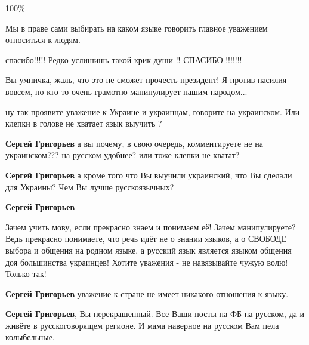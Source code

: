 \begin{itemize}
100\%

Мы в праве сами выбирать на каком языке говорить главное уважением относиться к людям.

спасибо!!!!! Редко услишишь такой крик души !! СПАСИБО !!!!!!!

Вы умничка, жаль, что это не сможет прочесть президент! Я против насилия вовсем, но кто то очень грамотно манипулирует нашим народом...

ну так проявите уважение к Украине и украинцам, говорите на украинском. Или клепки в голове не хватает язык выучить ?

\begin{itemize}

\textbf{Сергей Григорьев} а вы почему, в свою очередь, комментируете не на украинском??? на русском удобнее? или тоже клепки не хватат?

\textbf{Сергей Григорьев} а кроме того что Вы выучили украинский, что Вы сделали для Украины? Чем Вы лучше русскоязычных?

\textbf{Сергей Григорьев} 

Зачем учить мову, если прекрасно знаем и понимаем её!
Зачем манипулируете? Ведь прекрасно понимаете, что речь идёт не о знании
языков, а о СВОБОДЕ выбора и общения на родном языке, а русский язык является
языком общения доя большинства украинцев!  Хотите уважения - не навязывайте
чужую волю! Только так!


\textbf{Сергей Григорьев} уважение к стране не имеет никакого отношения к языку.

\textbf{Сергей Григорьев}, Вы перекрашенный. Все Ваши посты на ФБ на русском, да и живёте в русскоговорящем регионе. И мама наверное на русском Вам пела колыбельные.


\end{itemize}
\end{itemize}
